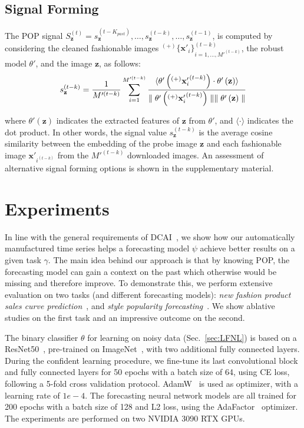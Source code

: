\documentclass[runningheads]{llncs}
\newcommand{\snamebig}[0] {POP\xspace}
\begin{document}
\subsection{Signal Forming\label{sec:SF}}
The \snamebig signal $S^{(t)}_\mathbf{z}=s^{(t-K_{past})}_\mathbf{z},\ldots,s^{(t-k)}_{\mathbf{z}},\ldots,s^{(t-1)}_{\mathbf{z}}$, is computed by considering the cleaned fashionable images ${}^{(+)}\{\mathbf{x}'_{i}\}_{i=1,\ldots,M'^{(t-k)}}^{(t-k)}$, the robust model $\theta'$, and the image $\mathbf{z}$, as follows:
\begin{equation}
\small
s^{(t-k)}_{\mathbf{z}}=\frac{1}{M'^{(t-k)}}\sum_{i=1}^{M'^{(t-k)}} \frac{
\langle\theta'\left({}^{(+)}{\mathbf{x}'_{i}}^{(t-k)}\right) \cdot \theta'\left(\mathbf{z}\right)\rangle}
{
    {\parallel\theta'\left({}^{(+)}{\mathbf{x}'_{i}}^{(t-k)}\right)\parallel}
    {\parallel\theta'\left(\mathbf{z}\right)\parallel}
}
\label{eq:signal.forming}
\end{equation}

where $\theta'\left(\mathbf{z} \right)$ indicates the extracted features of $\mathbf{z}$ from $\theta'$, and  $\langle \cdot \rangle$ indicates the dot product. In other words, the signal value $s^{(t-k)}_{\mathbf{z}}$ is the average cosine similarity between the embedding of the probe image $\mathbf{z}$ and each fashionable image $\mathbf{x}'_{i^{(t-k)}}$ from the $M'^{(t-k)}$ downloaded images. An assessment of alternative signal forming options is shown in the supplementary material. 
\section{Experiments}
\label{sec:experiments}
In line with the general requirements of DCAI~\cite{motamedi2021data}, we show how our automatically manufactured time series helps a forecasting model $\psi$ achieve better results on a given task $\gamma$. The main idea behind our approach is that by knowing \snamebig, the forecasting model can gain a context on the past which otherwise would be missing and therefore improve. To demonstrate this, we perform extensive evaluation on two tasks (and different forecasting models): \emph{new fashion product sales curve prediction}~\cite{singh_fashion_2019,ekambaram_attention_2020,skenderi2021well}, and \emph{style popularity forecasting}~\cite{al2017fashion}. We show ablative studies on the first task and an impressive outcome on the second.

The binary classifier $\theta$ for learning on noisy data (Sec.~\ref{sec:LFNL}) is based on a ResNet50~\cite{he2015deep}, pre-trained on ImageNet~\cite{imagenet}, with two additional fully connected layers. During the confident learning procedure, we fine-tune its last convolutional block and fully connected layers for 50 epochs with a batch size of 64, using CE loss, following a 5-fold cross validation protocol. AdamW~\cite{loshchilov2018decoupled} is used as optimizer, with a learning rate of $1e-4$. The forecasting neural network models are all trained for 200 epochs with a batch size of 128 and L2 loss, using the AdaFactor~\cite{shazeer2018adafactor} optimizer. The experiments are performed on two NVIDIA 3090 RTX GPUs. 
\end{document}
